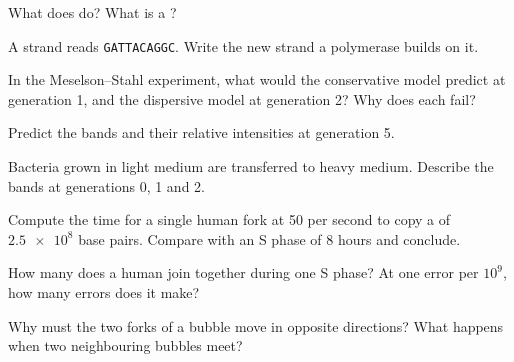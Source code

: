 \begin{exercise}[$\star$]\label{exo:g11:dna-replication:4}
What does  do? What is a ?
\end{exercise}

\begin{exercise}[$\star$]\label{exo:g11:dna-replication:5}
A strand reads \texttt{GATTACAGGC}. Write the new strand a polymerase
builds on it.
\end{exercise}

\begin{exercise}[$\star\star$]\label{exo:g11:dna-replication:6}
In the Meselson--Stahl experiment, what would the conservative model
predict at generation 1, and the dispersive model at generation 2?
Why does each fail?
\end{exercise}

\begin{exercise}[$\star\star$]\label{exo:g11:dna-replication:7}
Predict the bands and their relative intensities at generation 5.
\end{exercise}

\begin{exercise}[$\star\star$]\label{exo:g11:dna-replication:8}
Bacteria grown in light medium are transferred to heavy medium.
Describe the bands at generations 0, 1 and 2.
\end{exercise}

\begin{exercise}[$\star\star$]\label{exo:g11:dna-replication:9}
Compute the time for a single human fork at 50  per second to
copy a  of $\num{2.5e8}$ base pairs. Compare with an S phase
of 8 hours and conclude.
\end{exercise}

\begin{exercise}[$\star\star$]\label{exo:g11:dna-replication:10}
How many  does a human  join together during one S
phase? At one error per $10^9$, how many errors does it make?
\end{exercise}

\begin{exercise}[$\star\star$]\label{exo:g11:dna-replication:11}
Why must the two forks of a bubble move in opposite directions? What
happens when two neighbouring bubbles meet?
\end{exercise}

